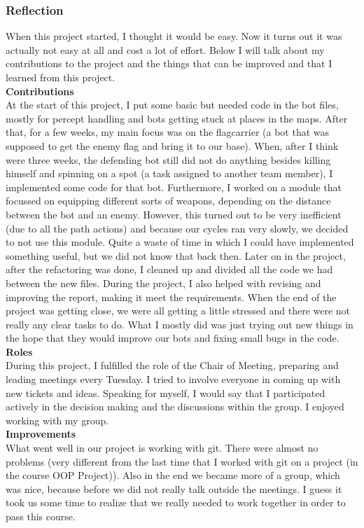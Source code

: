 \subsubsection{Reflection}
When this project started, I thought it would be easy. Now it turns out it was actually not easy at all and cost a lot of effort. Below I will talk about my contributions to the project and the things that can be improved and that I learned from this project.
\\[2mm]\noindent
\textbf{Contributions}\\
At the start of this project, I put some basic but needed code in the bot files, mostly for percept handling and bots getting stuck at places in the maps. After that, for a few weeks, my main focus was on the flagcarrier (a bot that was supposed to get the enemy flag and bring it to our base). When, after I think were three weeks, the defending bot still did not do anything besides killing himself and spinning on a spot (a task assigned to another team member), I implemented some code for that bot.
Furthermore, I worked on a module that focussed on equipping different sorts of weapons, depending on the distance between the bot and an enemy. However, this turned out to be very inefficient (due to all the path actions) and because our cycles ran very slowly, we decided to not use this module. Quite a waste of time in which I could have implemented something useful, but we did not know that back then.
Later on in the project, after the refactoring was done, I cleaned up and divided all the code we had between the new files. During the project, I also helped with revising and improving the report, making it meet the requirements.
When the end of the project was getting close, we were all getting a little stressed and there were not really any clear tasks to do. What I mostly did was just trying out new things in the hope that they would improve our bots and fixing small bugs in the code.
\\[2mm]\noindent
\textbf{Roles}\\
During this project, I fulfilled the role of the Chair of Meeting, preparing and leading meetings every Tuesday. I tried to involve everyone in coming up with new tickets and ideas. Speaking for myself, I would say that I participated actively in the decision making and the discussions within the group. I enjoyed working with my group.
\\[2mm]\noindent
\textbf{Improvements}\\
What went well in our project is working with git. There were almost no problems (very different from the last time that I worked with git on a project (in the course OOP Project)). Also in the end we became more of a group, which was nice, because before we did not really talk outside the meetings. I guess it took us some time to realize that we really needed to work together in order to pass this course.
